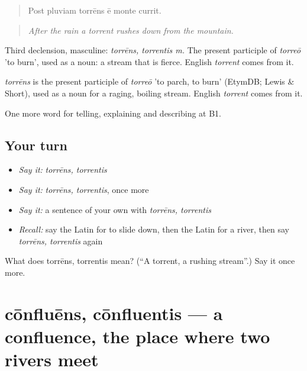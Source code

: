 \begin{quote}
Post pluviam torrēns ē monte currit.
\end{quote}

\begin{quote}
\emph{After the rain a torrent rushes down from the mountain.}
\end{quote}

Third declension, masculine: \emph{torrēns, torrentis m.} The present participle of \emph{torreō} 'to burn', used as a noun: a stream that is fierce. English \emph{torrent} comes from it.

\begin{cousinweb}
\emph{torrēns} is the present participle of \emph{torreō} 'to parch, to burn' (EtymDB; Lewis \& Short), used as a noun for a raging, boiling stream. English \emph{torrent} comes from it.
\end{cousinweb}

\begin{grammarlens}[title={What you've built}]
One more word for telling, explaining and describing at B1.
\end{grammarlens}

\subsection*{Your turn}
\begin{itemize}
\raggedright
  \item \emph{Say it:} \emph{torrēns, torrentis}
  \item \emph{Say it:} \emph{torrēns, torrentis}, once more
  \item \emph{Say it:} a sentence of your own with \emph{torrēns, torrentis}
  \item \emph{Recall:} say the Latin for to slide down, then the Latin for a river, then say \emph{torrēns, torrentis} again
\end{itemize}

\begin{tcolorbox}[breakable,colback=teal!4,colframe=teal!35!black,title={Before you move on}]
What does torrēns, torrentis mean? (\textquotedblleft{}A torrent, a rushing stream\textquotedblright{}.) Say it once more.
\end{tcolorbox}
\section[cōnfluēns, cōnfluentis]{cōnfluēns, cōnfluentis — a confluence, the place where two rivers meet}


